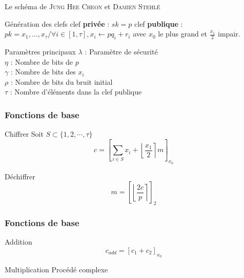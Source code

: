 \begin{frame}{Le schéma de \textsc{Jung Hee Cheon} et \textsc{Damien Stehlé}}
	\begin{alertblock}{Génération des clefs}
		clef \textbf{privée} : $ sk = p $ \newline
		clef \textbf{publique} : $ pk = x_1, \ldots , x_\tau / \forall i \in [ 1, \tau ], x_i \leftarrow p q_i + r_i $
		avec $ x_0 $ le plus grand et $ \frac{x_1}{2} $ impair. %
	\end{alertblock}
	
	\begin{alertblock}{Paramètres principaux}
	    $ \lambda $ : Paramètre de sécurité \\
	    $\eta$ : Nombre de bits de $p$ \\
	    $\gamma$ : Nombre de bits des $x_i$ \\
	    $\rho$ : Nombre de bits du bruit initial \\
	    $\tau$ : Nombre d'éléments dans la clef publique

	\end{alertblock}

\end{frame}

\begin{frame}
\frametitle{Fonctions de base}
	\begin{alertblock}{Chiffrer}
		Soit $S \subset \{1,2,\cdots,\tau\}$ \\
		$$c =  \left[ \sum_{i \in S} x_i + \left\lfloor \frac{x_1}{2} \right\rceil m \right]_{x_0}$$
	\end{alertblock}
	\begin{alertblock}{Déchiffrer}
		$$m= \left[ \left\lfloor \frac{2 c}{p} \right\rceil \right]_2$$
	\end{alertblock}
\end{frame}

\begin{frame}
\frametitle{Fonctions de base}
	\begin{alertblock}{Addition}
		$$c_{add} = [ c_1 + c_2 ]_{x_0}$$
	\end{alertblock}
		\begin{alertblock}{Multiplication}
		Procédé complexe
	\end{alertblock}
\end{frame}